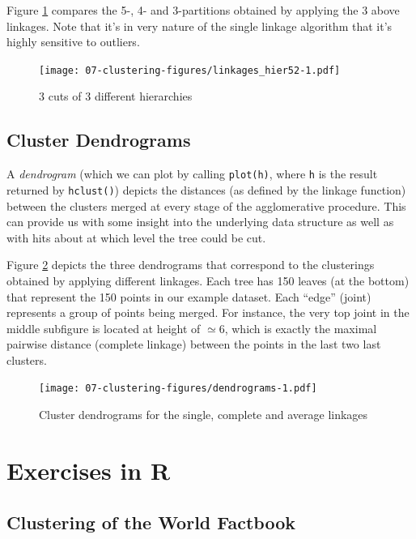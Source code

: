 \documentclass[10pt,b5paper,krantz1]{krantz}
\begin{document}
Figure \ref{fig:linkages_hier52} compares the 5-, 4- and 3-partitions
obtained by applying the 3 above linkages. Note that it's in very nature of
the single linkage algorithm that it's highly sensitive to outliers.

\begin{figure}
\hypertarget{fig:linkages_hier52}{%
\centering
\texttt{[image: 07-clustering-figures/linkages\_hier52-1.pdf]}
\caption{3 cuts of 3 different hierarchies}\label{fig:linkages_hier52}
}
\end{figure}

\hypertarget{cluster-dendrograms}{%
\subsection{Cluster Dendrograms}\label{cluster-dendrograms}}

A \emph{dendrogram} (which we can plot by calling \texttt{plot(h)}, where \texttt{h} is
the result returned by \texttt{hclust()}) depicts the distances
(as defined by the linkage function) between the clusters merged at every stage
of the agglomerative procedure.
This can provide us with some insight into the underlying data structure
as well as with hits about at which level the tree could be cut.

Figure \ref{fig:dendrograms} depicts the three dendrograms
that correspond to the clusterings obtained by applying different linkages.
Each tree has 150 leaves (at the bottom) that represent the 150 points
in our example dataset. Each ``edge'' (joint) represents a group of points
being merged. For instance, the very top joint in the middle subfigure
is located at height of \(\simeq 6\), which is exactly the
maximal pairwise distance (complete linkage) between the points
in the last two last clusters.

\begin{figure}
\hypertarget{fig:dendrograms}{%
\centering
\texttt{[image: 07-clustering-figures/dendrograms-1.pdf]}
\caption{Cluster dendrograms for the single, complete and average linkages}\label{fig:dendrograms}
}
\end{figure}

\hypertarget{exercises-in-r-3}{%
\section{Exercises in R}\label{exercises-in-r-3}}

\hypertarget{clustering-of-the-world-factbook}{%
\subsection{Clustering of the World Factbook}\label{clustering-of-the-world-factbook}}
\end{document}
